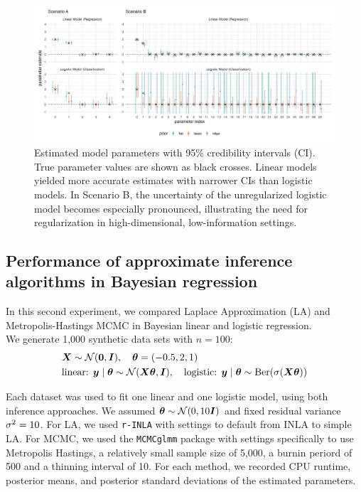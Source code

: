 \begin{figure}[htbp]
    \centering
    \includegraphics[width=\linewidth]{../figures/reg_all.png}
    \caption{Estimated model parameters with 95\% credibility intervals (CI). True parameter values are shown as black crosses. Linear models yielded more accurate estimates with narrower CIs than logistic models. In Scenario B, the uncertainty of the unregularized logistic model becomes especially pronounced, illustrating the need for regularization in high-dimensional, low-information settings.
    }
    \label{fig:reg-params}
\end{figure}

\subsection{Performance of approximate inference algorithms in Bayesian regression}

In this second experiment, we compared Laplace Approximation (LA) and Metropolis-Hastings MCMC in Bayesian linear and logistic regression.\\

We generate 1,000 synthetic data sets with $n=100$:
\begin{equation*}
    \begin{aligned}
        &\bm{X} \sim \mathcal{N}(\bm{0}, \bm{I}), \quad \bm{\theta} = (-0.5, 2, 1)\\
        &\text{linear: } \bm{y} \mid \bm{\theta} \sim \mathcal{N}(\bm{X} \bm{\theta}, \bm{I}),\quad \text{logistic: } \bm{y} \mid \bm{\theta} \sim \text{Ber}(\sigma(\bm{X} \bm{\theta}))
    \end{aligned}
\end{equation*}

Each dataset was used to fit one linear and one logistic model, using both inference approaches.
We assumed $\bm{\theta} \sim \mathcal{N}(0, 10 \bm{I})$ and fixed residual variance $\sigma^2 = 10$.
For LA, we used \texttt{r-INLA} with settings to default from INLA to simple LA.
For MCMC, we used the \texttt{MCMCglmm} package with settings specifically to use Metropolis Hastings, a relatively small sample size of 5,000, a burnin periord of 500 and a thinning interval of 10.
For each method, we recorded CPU runtime, posterior means, and posterior standard deviations of the estimated parameters.\\

